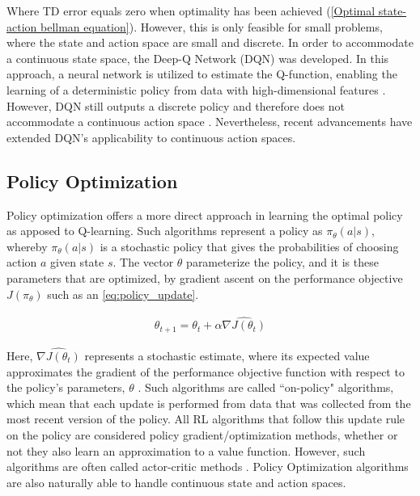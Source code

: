 Where TD error equals zero when optimality has been achieved (\autoref{Optimal state-action bellman equation}). However, this is only feasible for small problems, where the state and action space are small and discrete. In order to accommodate a continuous state space, the Deep-Q Network (DQN) was developed. In this approach, a neural network is utilized to estimate the Q-function, enabling the learning of a deterministic policy from data with high-dimensional features \cite{mnihPlayingAtariDeep2013}. However, DQN still outputs a discrete policy and therefore does not accommodate a continuous action space \cite{mnihPlayingAtariDeep2013}. Nevertheless, recent advancements have extended DQN's applicability to continuous action spaces.

\subsection{Policy Optimization}
Policy optimization offers a more direct approach in learning the optimal policy as apposed to Q-learning. Such algorithms represent a policy as $\pi_{\theta}(a|s)$, whereby $\pi_{\theta}(a|s)$ is a stochastic policy that gives the probabilities of choosing action $a$ given state $s$. The vector $\theta$ parameterize the policy, and it is these parameters that are optimized, by gradient ascent on the performance objective $J(\pi_{\theta})$ such as an \autoref{eq:policy_update}.


\begin{equation}
	\begin{aligned}
		\theta_{t+1} = \theta_{t} + \alpha \hat{\nabla J(\theta_t)}
	\end{aligned}
	\label{eq:policy_update}
\end{equation}

Here, $\hat{\nabla J(\theta_t)}$ represents a stochastic estimate, where its expected value approximates the gradient of the performance objective function with respect to the policy's parameters, $\theta$ \cite{suttonReinforcementLearningIntroduction2014}. Such algorithms are called ``on-policy" algorithms, which mean that each update is performed from data that was collected from the most recent version of the policy.
All RL algorithms that follow this update rule on the policy are considered policy gradient/optimization methods, whether or not they also learn an approximation to a value function. However, such algorithms are often called actor-critic methods \cite{suttonReinforcementLearningIntroduction2014}.  Policy Optimization algorithms are also naturally able to handle continuous state and action spaces.


